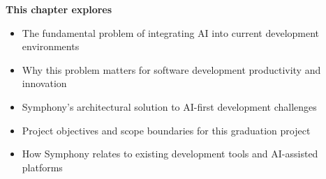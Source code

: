 \begin{tcolorbox}[
    enhanced,
    colback=white,
    colframe=brandPrimary!40,
    boxrule=1pt,
    arc=12pt,
    drop shadow={brandPrimary!20},
    left=1.5cm,
    right=1.5cm,
    top=1.2cm,
    bottom=1.2cm,
    before upper={\parindent0pt}
]
\begin{center}
{\Large\textbf{\textcolor{brandPrimary}{This chapter explores}}}
\end{center}

\vspace{0.8cm}

\begin{itemize}[leftmargin=1.2cm, itemsep=0.4cm, label={\textcolor{brandAccent}{$\triangleright$}}]
    \item {\large The fundamental problem of integrating AI into current development environments}
    \item {\large Why this problem matters for software development productivity and innovation}
    \item {\large Symphony's architectural solution to AI-first development challenges}
    \item {\large Project objectives and scope boundaries for this graduation project}
    \item {\large How Symphony relates to existing development tools and AI-assisted platforms}
\end{itemize}
\end{tcolorbox}

\clearpage
